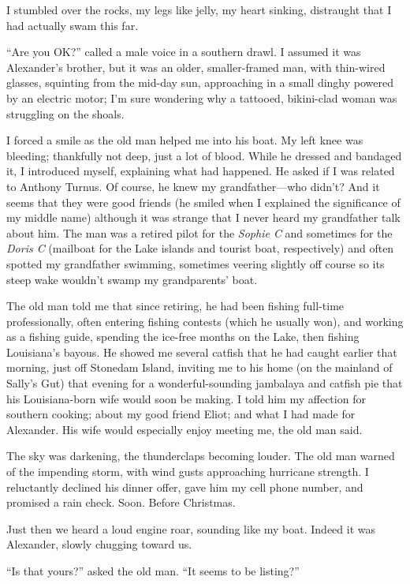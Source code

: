 I stumbled over the rocks, my legs like jelly, my heart sinking,
distraught that I had actually swam this far.

``Are you OK?'' called a male voice in a southern drawl. I assumed it
was Alexander's brother, but it was an older, smaller-framed man, with
thin-wired glasses, squinting from the mid-day sun, approaching in a
small dinghy powered by an electric motor; I'm sure wondering why a
tattooed, bikini-clad woman was struggling on the shoals.

I forced a smile as the old man helped me into his boat. My left knee
was bleeding; thankfully not deep, just a lot of blood. While he dressed
and bandaged it, I introduced myself, explaining what had happened. He
asked if I was related to Anthony Turnus. Of course, he knew my
grandfather---who didn't? And it seems that they were good friends (he
smiled when I explained the significance of my middle name) although it
was strange that I never heard my grandfather talk about him. The man
was a retired pilot for the \emph{Sophie C} and sometimes for the
\emph{Doris C} (mailboat for the Lake islands and tourist boat,
respectively) and often spotted my grandfather swimming, sometimes
veering slightly off course so its steep wake wouldn't swamp my
grandparents' boat.

The old man told me that since retiring, he had been fishing full-time
professionally, often entering fishing contests (which he usually won),
and working as a fishing guide, spending the ice-free months on the
Lake, then fishing Louisiana's bayous. He showed me several catfish that
he had caught earlier that morning, just off Stonedam Island, inviting
me to his home (on the mainland of Sally's Gut) that evening for a
wonderful-sounding jambalaya and catfish pie that his Louisiana-born
wife would soon be making. I told him my affection for southern cooking;
about my good friend Eliot; and what I had made for Alexander. His wife
would especially enjoy meeting me, the old man said.

The sky was darkening, the thunderclaps becoming louder. The old man
warned of the impending storm, with wind gusts approaching hurricane
strength. I reluctantly declined his dinner offer, gave him my cell
phone number, and promised a rain check. Soon. Before Christmas.

Just then we heard a loud engine roar, sounding like my boat. Indeed it
was Alexander, slowly chugging toward us.

``Is that yours?'' asked the old man. ``It seems to be listing?''

